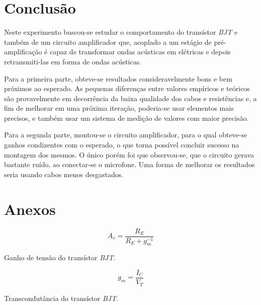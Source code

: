 \documentclass{article}
\begin{document}
    \section{Conclusão}
        Neste experimento buscou-se estudar o comportamento do transístor \emph{BJT} e também de um circuito amplificador que, acoplado a um estágio de pré-amplificação é capaz de transformar ondas acústicas em elétricas e depois retransmiti-las em forma de ondas acústicas. 
        
        Para a primeira parte, obteve-se resultados consideravelmente bons e bem próximos ao esperado. As pequenas diferenças entre valores empíricos e teóricos são provavelmente em decorrência da baixa qualidade dos cabos e resistências e, a fim de melhorar em uma próxima iteração, poderia-se usar elementos mais precisos, e também usar um sistema de medição de valores com maior precisão.
        
        Para a segunda parte, montou-se o circuito amplificador, para o qual obteve-se ganhos condizentes com o esperado, o que torna possível concluir sucesso na montagem dos mesmos. O único porém foi que observou-se, que o circuito gerava bastante ruído, ao conectar-se o microfone. Uma forma de melhorar os resultados seria usando cabos menos desgastados.
    
    \nocite{*}
    
    
    
    \newpage
    \section*{Anexos}
    
    \begin{eqfloat}[h!]
        \begin{equation}
            A_v = \frac{R_E}{R_E + g_m^{-1}}
            \label{eq:ganho_tensao}
        \end{equation}
        \caption{Ganho de tensão do transístor \emph{BJT}.}
    \end{eqfloat}
    
    \begin{eqfloat}[h!]
        \begin{equation}
            g_m = \frac{I_C}{V_T}
            \label{eq:transcondutancia}
        \end{equation}
        \caption{Transcondutância do transístor \emph{BJT}.}
    \end{eqfloat}
    
\end{document}
